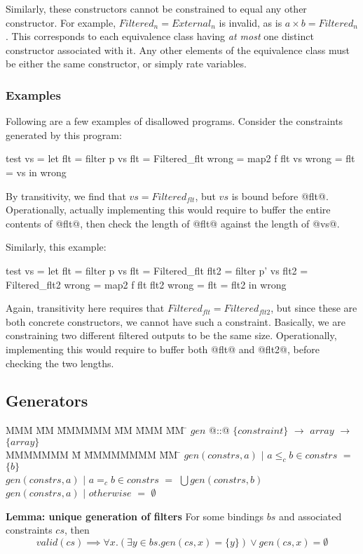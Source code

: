Similarly, these constructors cannot be constrained to equal any other constructor. 
For example, $Filtered_n = External_n$ is invalid, as is $a \times b = Filtered_n$.
This corresponds to each equivalence class having \emph{at most} one distinct constructor associated with it. Any other elements of the equivalence class must be either the same constructor, or simply rate variables.

\subsubsection{Examples}
Following are a few examples of disallowed programs.
Consider the constraints generated by this program:
\begin{code}
test vs    =
 let flt   = filter p vs        { flt   = Filtered_flt }
     wrong = map2   f flt vs    { wrong = flt = vs     }
 in  wrong
\end{code}
By transitivity, we find that $vs = Filtered_{flt}$, but $vs$ is bound before @flt@.
Operationally, actually implementing this would require to buffer the entire contents of @flt@, then check the length of @flt@ against the length of @vs@.


Similarly, this example:
\begin{code}
test vs    =
 let flt   = filter p  vs       { flt   = Filtered_flt  }
     flt2  = filter p' vs       { flt2  = Filtered_flt2 }
     wrong = map2   f  flt flt2 { wrong = flt = flt2    }
 in  wrong
\end{code}
Again, transitivity here requires that $Filtered_{flt} = Filtered_{flt2}$, but since these are both concrete constructors, we cannot have such a constraint.
Basically, we are constraining two different filtered outputs to be the same size.
Operationally, implementing this would require to buffer both @flt@ and @flt2@, before checking the two lengths.

\subsection{Generators}

\begin{tabbing}
MMM       \= MM \= MMMMMM \= MM \= MMM \= MM \= \kill
$gen$   \> @::@  \> $\{constraint\}$  \> $\to$ \> $array$ \> $\to$ \> $\{array\}$ \\
MMMMMMM                 \= M  \= MMMMMMMM \= MM \= \kill
$gen(constrs, a)$ \> $|$ \> $a \le_c b \in constrs$ \> $=$ \> $\{b\}$                        \\
$gen(constrs, a)$ \> $|$ \> $a =_c b \in constrs$   \> $=$ \> $\bigcup gen(constrs, b)$                        \\
$gen(constrs, a)$ \> $|$ \> $otherwise$             \> $=$ \> $\emptyset$                        \\
\end{tabbing}

\textbf{Lemma: unique generation of filters}
For some bindings $bs$ and associated constraints $cs$, then
\[
valid(cs) \implies \forall x. (\exists y \in bs. gen(cs, x) = \{y\}) \vee gen(cs, x) = \emptyset
\]

